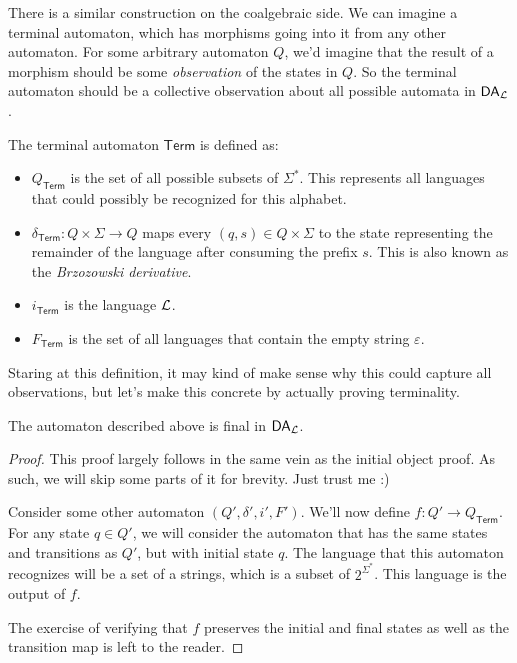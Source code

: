 There is a similar construction on the coalgebraic side.
We can imagine a terminal automaton, which has morphisms going into it from any other automaton.
For some arbitrary automaton $Q$, we'd imagine that the result of a morphism should be some \emph{observation} of the states in $Q$.
So the terminal automaton should be a collective observation about all possible automata in $\mathsf{DA}_\mathcal L$.

\newcommand{\Term}{\mathsf{Term}}
\begin{definition}
  The terminal automaton $\Term$ is defined as:
  \begin{itemize}
    \item
        $Q_\Term$ is the set of all possible subsets of $\Sigma^*$.
        This represents all languages that could possibly be recognized for this alphabet.
    \item
        $\delta_\Term : Q \times \Sigma \rightarrow Q$ maps every $(q, s) \in Q \times \Sigma$ to the state representing the remainder of the language after consuming the prefix $s$.
        This is also known as the \emph{Brzozowski derivative}.
    \item $i_\Term$ is the language $\mathcal L$.
    \item $F_\Term$ is the set of all languages that contain the empty string $\varepsilon$.
  \end{itemize}
\end{definition}

Staring at this definition, it may kind of make sense why this could capture all observations, but let's make this concrete by actually proving terminality.

\begin{theorem}
    The automaton described above is final in $\mathsf{DA}_\mathcal L$.
\end{theorem}

\begin{proof}
This proof largely follows in the same vein as the initial object proof.
As such, we will skip some parts of it for brevity. Just trust me :)

Consider some other automaton $(Q', \delta', i', F')$.
We'll now define $f : Q' \rightarrow Q_\Term$.
For any state $q \in Q'$, we will consider the automaton that has the same states and transitions as $Q'$, but with initial state $q$.
The language that this automaton recognizes will be a set of a strings, which is a subset of $2^{\Sigma^*}$.
This language is the output of $f$.

The exercise of verifying that $f$ preserves the initial and final states as well as the transition map is left to the reader.
\end{proof}

